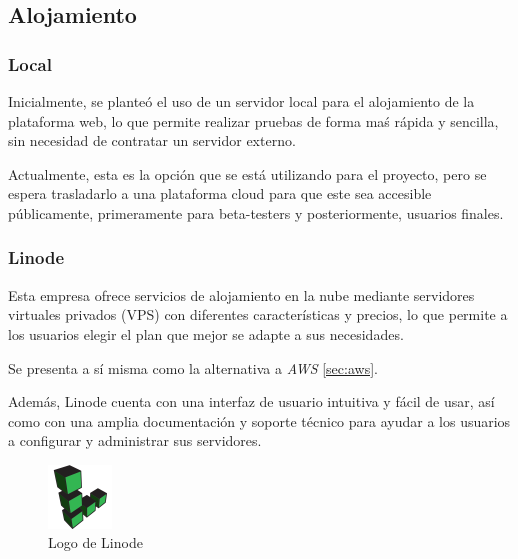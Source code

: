         \subsection{Alojamiento}

            \subsubsection{Local}

                Inicialmente, se planteó el uso de un servidor local para el alojamiento de la plataforma web, lo que permite realizar pruebas de forma maś rápida y sencilla, sin necesidad de contratar un servidor externo.

                Actualmente, esta es la opción que se está utilizando para el proyecto, pero se espera trasladarlo a una plataforma cloud para que este sea accesible públicamente, primeramente para beta-testers y posteriormente, usuarios finales.

                
            \subsubsection{Linode}

                Esta empresa ofrece servicios de alojamiento en la nube mediante servidores virtuales privados (VPS) con diferentes características y precios, lo que permite a los usuarios elegir el plan que mejor se adapte a sus necesidades.

                Se presenta a sí misma como la alternativa a \textit{AWS} \ref{sec:aws}.

                Además, Linode cuenta con una interfaz de usuario intuitiva y fácil de usar, así como con una amplia documentación y soporte técnico para ayudar a los usuarios a configurar y administrar sus servidores.

                \begin{figure}[htbp]
                    \centering

                    \includegraphics[width=0.15\textwidth]{images/Logos/linode.png}
                    \caption{Logo de Linode}

                    \label{fig:linode-logo}
                \end{figure}

